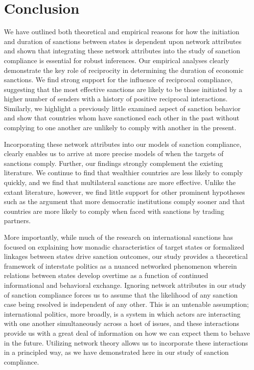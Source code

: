 \section*{Conclusion}
\label{conclusion}

We have outlined both theoretical and empirical reasons for how the initiation and duration of sanctions between states is dependent upon network attributes and shown that integrating these network attributes into the study of sanction compliance is essential for robust inferences. Our empirical analyses clearly demonstrate the key role of reciprocity in determining the duration of economic sanctions. We find strong support for the influence of reciprocal compliance, suggesting that the most effective sanctions are likely to be those initiated by a higher number of senders with a history of positive reciprocal interactions. Similarly, we highlight a previously little examined aspect of sanction behavior and show that countries whom have sanctioned each other in the past without complying to one another are unlikely to comply with another in the present. 

Incorporating these network attributes into our models of sanction compliance, clearly enables us to arrive at more precise models of when the targets of sanctions comply. Further, our findings strongly complement the existing literature. We continue to find that wealthier countries are less likely to comply quickly, and we find that multilateral sanctions are more effective. Unlike the extant literature, however, we find little support for other prominent hypotheses such as the argument that more democratic institutions comply sooner and that countries are more likely to comply when faced with sanctions by trading partners. 

More importantly, while much of the research on international sanctions has focused on explaining how monadic characteristics of target states or formalized linkages between states drive sanction outcomes, our study provides a theoretical framework of interstate politics as a nuanced networked phenomenon wherein relations between states develop overtime as a function of continued informational and behavioral exchange. Ignoring network attributes in our study of sanction compliance forces us to assume that the likelihood of any sanction case being resolved is independent of any other. This is an untenable assumption; international politics, more broadly, is a system in which actors are interacting with one another simultaneously across a host of issues, and these interactions provide us with a great deal of information on how we can expect them to behave in the future. Utilizing network theory allows us to incorporate these interactions in a principled way, as we have demonstrated here in our study of sanction compliance.

